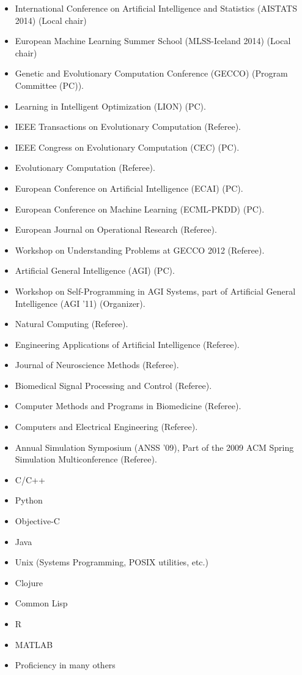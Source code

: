 \documentclass[a4paper,10pt]{cvclean}
\begin{document}
\begin{Professional Activities}
\begin{itemize}
\item International Conference on Artificial Intelligence and Statistics
  (AISTATS 2014) (Local chair)
\item European Machine Learning Summer School (MLSS-Iceland 2014) (Local chair)
\item Genetic and Evolutionary Computation Conference (GECCO) (Program Committee
  (PC)).
\item Learning in Intelligent Optimization (LION) (PC).
\item IEEE Transactions on Evolutionary Computation (Referee).
\item IEEE Congress on Evolutionary Computation (CEC) (PC).
\item Evolutionary Computation (Referee).
\item European Conference on Artificial Intelligence (ECAI) (PC).
\item European Conference on Machine Learning (ECML-PKDD) (PC).
\item European Journal on Operational Research (Referee).
\item Workshop on Understanding Problems at GECCO 2012 (Referee).
\item Artificial General Intelligence (AGI) (PC).
\item Workshop on Self-Programming in AGI Systems, part of Artificial
  General Intelligence (AGI '11) (Organizer).
\item Natural Computing (Referee).
\item Engineering Applications of Artificial Intelligence (Referee).
\item Journal of Neuroscience Methods (Referee).
\item Biomedical Signal Processing and Control (Referee).
\item Computer Methods and Programs in Biomedicine (Referee).
\item Computers and Electrical Engineering (Referee).
\item Annual Simulation Symposium (ANSS '09), Part of the 2009 ACM Spring
  Simulation Multiconference (Referee).
\end{itemize}
\end{Professional Activities}


\begin{Technical Skills}
\begin{itemize} 
\item C/C++
\item Python
\item Objective-C
\item Java
\item Unix (Systems Programming, POSIX utilities, etc.)
\item Clojure
\item Common Lisp
\item R
\item MATLAB
\item Proficiency in many others
\end{itemize}
\end{Technical Skills}
\end{document}
